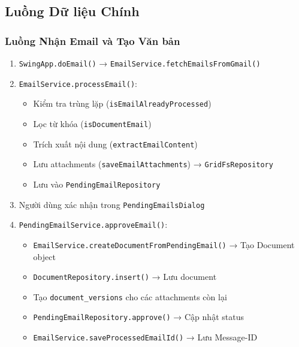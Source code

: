 \documentclass[12pt,a4paper]{article}
\begin{document}
\subsection{Luồng Dữ liệu Chính}

\subsubsection{Luồng Nhận Email và Tạo Văn bản}
\begin{enumerate}
    \item \texttt{SwingApp.doEmail()} → \texttt{EmailService.fetchEmailsFromGmail()}
    \item \texttt{EmailService.processEmail()}:
    \begin{itemize}
        \item Kiểm tra trùng lặp (\texttt{isEmailAlreadyProcessed})
        \item Lọc từ khóa (\texttt{isDocumentEmail})
        \item Trích xuất nội dung (\texttt{extractEmailContent})
        \item Lưu attachments (\texttt{saveEmailAttachments}) → \texttt{GridFsRepository}
        \item Lưu vào \texttt{PendingEmailRepository}
    \end{itemize}
    \item Người dùng xác nhận trong \texttt{PendingEmailsDialog}
    \item \texttt{PendingEmailService.approveEmail()}:
    \begin{itemize}
        \item \texttt{EmailService.createDocumentFromPendingEmail()} → Tạo Document object
        \item \texttt{DocumentRepository.insert()} → Lưu document
        \item Tạo \texttt{document\_versions} cho các attachments còn lại
        \item \texttt{PendingEmailRepository.approve()} → Cập nhật status
        \item \texttt{EmailService.saveProcessedEmailId()} → Lưu Message-ID
    \end{itemize}
\end{enumerate}
\end{document}
